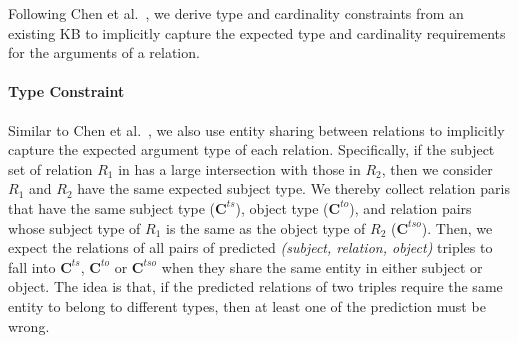 

Following Chen et al.~, we derive type and cardinality constraints from an existing KB to implicitly capture the expected type and cardinality requirements for the arguments of a relation. 
\paragraph{Type Constraint}
Similar to Chen et al.~, we also use entity sharing between relations to implicitly capture the expected argument type of each relation.
Specifically, if the subject set of relation $R_1$ in \KB has a large intersection with those in $R_2$, then we consider $R_1$ and $R_2$ have the same expected subject type. 
We thereby collect relation paris that have the same subject type ($\textbf{C}^{ts}$), object type ($\textbf{C}^{to}$), and relation pairs whose subject type of $R_1$ is the same as the object type of $R_2$ ($\textbf{C}^{tso}$).
Then, we expect the relations of all pairs of predicted \emph{(subject, relation, object)} triples to fall into $\textbf{C}^{ts}$, $\textbf{C}^{to}$ or $\textbf{C}^{tso}$ when they share the same entity in either subject or object.
The idea is that, if the predicted relations of two triples require the same entity to belong to different types, then at least one of the prediction must be wrong.

